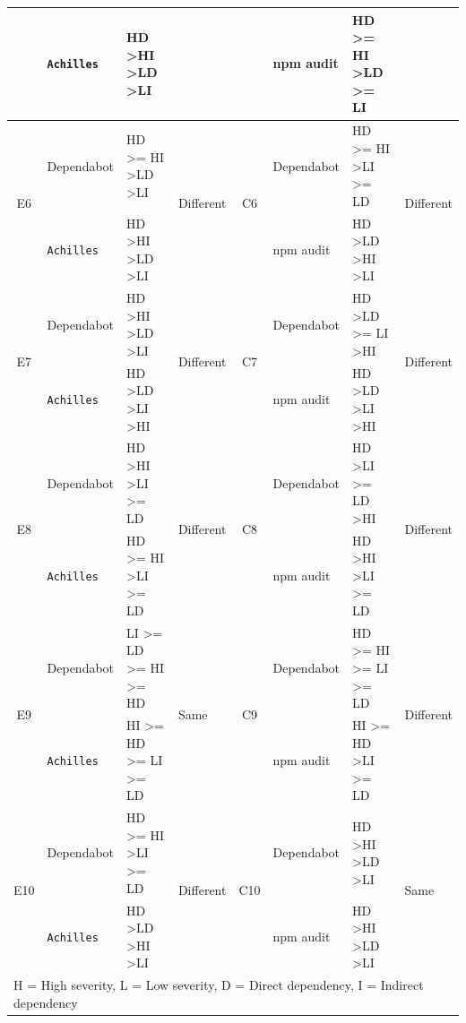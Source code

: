 \documentclass[conference]{IEEEtran}
\begin{document}
\begin{table}[tb]
\begin{tabular}{clll|clll}
			& \texttt{Achilles}   & HD \textgreater HI \textgreater LD \textgreater LI & & & npm audit & HD \textgreater{}= HI \textgreater LD \textgreater{}= LI  & \\ 
			\midrule
			\multirow{2}{*}{E6}  & Dependabot & HD \textgreater{}= HI \textgreater LD \textgreater LI       & \multirow{2}{*}{Different}      & \multirow{2}{*}{C6} & Dependabot & HD \textgreater{}= HI \textgreater LI \textgreater{}= LD & \multirow{2}{*}{Different} \\ 
			& \texttt{Achilles}   & HD \textgreater HI \textgreater LD \textgreater LI & & & npm audit & HD \textgreater LD \textgreater HI \textgreater LI & \\ 
			\midrule
			\multirow{2}{*}{E7}  & Dependabot & HD \textgreater HI \textgreater LD \textgreater LI & \multirow{2}{*}{Different}      & \multirow{2}{*}{C7} & Dependabot & HD \textgreater LD \textgreater{}= LI \textgreater HI & \multirow{2}{*}{Different} \\  
			& \texttt{Achilles}   & HD \textgreater LD \textgreater LI \textgreater HI & & & npm audit & HD \textgreater LD \textgreater LI \textgreater HI &  \\ 
			\midrule
			\multirow{2}{*}{E8}  & Dependabot & HD \textgreater HI \textgreater LI \textgreater{}= LD       & \multirow{2}{*}{Different}      & \multirow{2}{*}{C8} & Dependabot & HD \textgreater LI \textgreater{}= LD \textgreater HI & \multirow{2}{*}{Different} \\ 
			& \texttt{Achilles}   & HD \textgreater{}= HI \textgreater LI \textgreater{}= LD    &                                 & & npm audit & HD \textgreater HI \textgreater LI \textgreater{}= LD & \\ 
			\midrule
			\multirow{2}{*}{E9}  & Dependabot & LI \textgreater{}= LD \textgreater{}= HI \textgreater{}= HD & \multirow{2}{*}{Same}           & \multirow{2}{*}{C9} & Dependabot & HD \textgreater{}= HI \textgreater{}= LI \textgreater{}= LD & \multirow{2}{*}{Different} \\ 
			& \texttt{Achilles}   & HI \textgreater{}= HD \textgreater{}= LI \textgreater{}= LD &                                 & & npm audit & HI \textgreater{}= HD \textgreater LI \textgreater{}= LD &  \\ 
			\midrule
			\multirow{2}{*}{E10} & Dependabot & HD \textgreater{}= HI \textgreater LI \textgreater{}= LD    & \multirow{2}{*}{Different}      & \multirow{2}{*}{C10} & Dependabot & HD \textgreater HI \textgreater LD \textgreater LI & \multirow{2}{*}{Same} \\ 
			& \texttt{Achilles}   & HD \textgreater LD \textgreater HI \textgreater LI          &                                 & & npm audit & HD \textgreater HI \textgreater LD \textgreater LI & \\ 
			\bottomrule
			\multicolumn{8}{l}{H = High severity, L = Low severity, D = Direct dependency, I = Indirect dependency} \\
		\end{tabular}
		\label{table:ach-indirect}
	\end{table}
	
\end{document}
